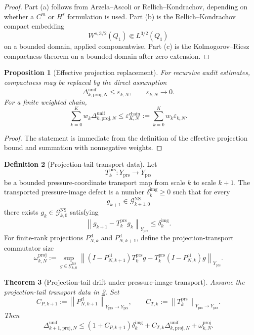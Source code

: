 \documentclass[11pt]{article}
\numberwithin{equation}{section}
\theoremstyle{plain}
\newtheorem{theorem}{Theorem}[section]
\newtheorem{proposition}[theorem]{Proposition}
\theoremstyle{definition}
\newtheorem{definition}[theorem]{Definition}
\theoremstyle{remark}
\newcommand{\NS}{\mathrm{NS}}
\newcommand{\cl}{\mathrm{cl}}
\newcommand{\prs}{\mathrm{prs}}
\newcommand{\proj}{\mathrm{proj}}
\newcommand{\norm}[1]{\left\lVert #1\right\rVert}
\begin{document}
\begin{proof}
Part (a) follows from Arzela--Ascoli or Rellich--Kondrachov, depending on
whether a \(C^m\) or \(H^s\) formulation is used.  Part (b) is the
Rellich--Kondrachov compact embedding
\[
  W^{s,3/2}(Q_1)\Subset L^{3/2}(Q_1)
\]
on a bounded domain, applied componentwise.  Part (c) is the
Kolmogorov--Riesz compactness theorem on a bounded domain after zero
extension.
\end{proof}

\begin{proposition}[Effective projection replacement]\label{prop:effective-proj}
For recursive audit estimates, compactness may be replaced by the direct
assumption
\[
  \Delta_{k,\proj,N}^{\mathrm{unif}}\le \varepsilon_{k,N},
  \qquad
  \varepsilon_{k,N}\to0.
\]
For a finite weighted chain,
\[
  \sum_{k=0}^K w_k\Delta_{k,\proj,N}^{\mathrm{unif}}
  \le
  \varepsilon_{K,N}^{\mathrm{chain}}
  :=
  \sum_{k=0}^K w_k\varepsilon_{k,N}.
\]
\end{proposition}

\begin{proof}
The statement is immediate from the definition of the effective projection
bound and summation with nonnegative weights.
\end{proof}

\begin{definition}[Projection-tail transport data]\label{def:proj-transport}
Let
\[
  T_k^{\prs}:Y_{\prs}\to Y_{\prs}
\]
be a bounded pressure-coordinate transport map from scale \(k\) to scale
\(k+1\).  The transported pressure-image defect is a number
\(\delta_{k}^{\mathrm{img}}\ge0\) such that for every
\[
  g_{k+1}\in\mathcal G_{k+1,0}^{\NS}
\]
there exists \(g_k\in\mathcal G_{k,0}^{\NS}\) satisfying
\[
  \norm{g_{k+1}-T_k^{\prs}g_k}_{Y_{\prs}}
  \le
  \delta_k^{\mathrm{img}}.
\]
For finite-rank projections \(P_{N,k}^{\cl}\) and \(P_{N,k+1}^{\cl}\), define
the projection-transport commutator size
\[
  \omega_{k,N}^{\proj}
  :=
  \sup_{g\in\mathcal G_{k,0}^{\NS}}
  \norm{
  (I-P_{N,k+1}^{\cl})T_k^{\prs}g
  -
  T_k^{\prs}(I-P_{N,k}^{\cl})g
  }_{Y_{\prs}}.
\]
\end{definition}

\begin{theorem}[Projection-tail drift under pressure-image transport]\label{thm:proj-tail-drift}
Assume the projection-tail transport data in \cref{def:proj-transport}.  Set
\[
  C_{P,k+1}:=\norm{P_{N,k+1}^{\cl}}_{Y_{\prs}\to Y_{\prs}},
  \qquad
  C_{T,k}:=\norm{T_k^{\prs}}_{Y_{\prs}\to Y_{\prs}}.
\]
Then
\[
  \Delta_{k+1,\proj,N}^{\mathrm{unif}}
  \le
  (1+C_{P,k+1})\delta_k^{\mathrm{img}}
  +
  C_{T,k}\Delta_{k,\proj,N}^{\mathrm{unif}}
  +
  \omega_{k,N}^{\proj}.
\]
\end{theorem}
\end{document}
